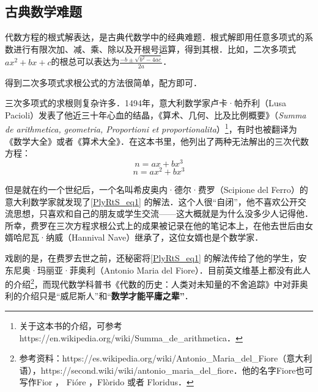 


\subsection{古典数学难题}

代数方程的根式解表达，是古典代数学中的经典难题．根式解即用任意多项式的系数进行有限次加、减、乘、除以及开根号运算，得到其根．比如，二次多项式$ax^2+bx+c$的根总可以表达为$\frac{-b\pm\sqrt{b^2-4ac}}{2a}$．

得到二次多项式求根公式的方法很简单，配方即可．

三次多项式的求根则复杂许多．1494年，意大利数学家卢卡·帕乔利（Lusa Pacioli）发表了他近三十年心血的结晶，《算术、几何、比及比例概要》（\textsl{Summa de arithmetica, geometria, Proportioni et proportionalita}）\footnote{关于这本书的介绍，可参考https://en.wikipedia.org/wiki/Summa_de_arithmetica．}，有时也被翻译为《数学大全》或者《算术大全》．在这本书里，他列出了两种无法解出的三次代数方程：
\begin{equation}\label{PlyRtS_eq1}
n=ax+bx^3
\end{equation}
\begin{equation}
n=ax^2+bx^3
\end{equation}

但是就在约一个世纪后，一个名叫希皮奥内·德尔·费罗（Scipione del Ferro）的意大利数学家就发现了\autoref{PlyRtS_eq1} 的解法．这个人很“自闭”，他不喜欢公开交流思想，只喜欢和自己的朋友或学生交流——这大概就是为什么没多少人记得他．所幸，费罗在三次方程求根公式上的成果被记录在他的笔记本上，在他去世后由女婿哈尼瓦·纳威（Hannival Nave）继承了，这位女婿也是个数学家．

戏剧的是，在费罗去世之前，还秘密将\autoref{PlyRtS_eq1} 的解法传给了他的学生，安东尼奥·玛丽亚·菲奥利（Antonio Maria del Fiore）．目前英文维基上都没有此人的介绍\footnote{参考资料：https://es.wikipedia.org/wiki/Antonio_Maria_del_Fiore（意大利语），https://second.wiki/wiki/antonio_maria_del_fiore．他的名字Fiore也可写作Fior ， Fióre ，Flòrido 或者 Floridus．}，而现代数学科普书《代数的历史：人类对未知量的不舍追踪》中对菲奥利的介绍只是“威尼斯人”和“\textbf{数学才能平庸之辈”}．





















